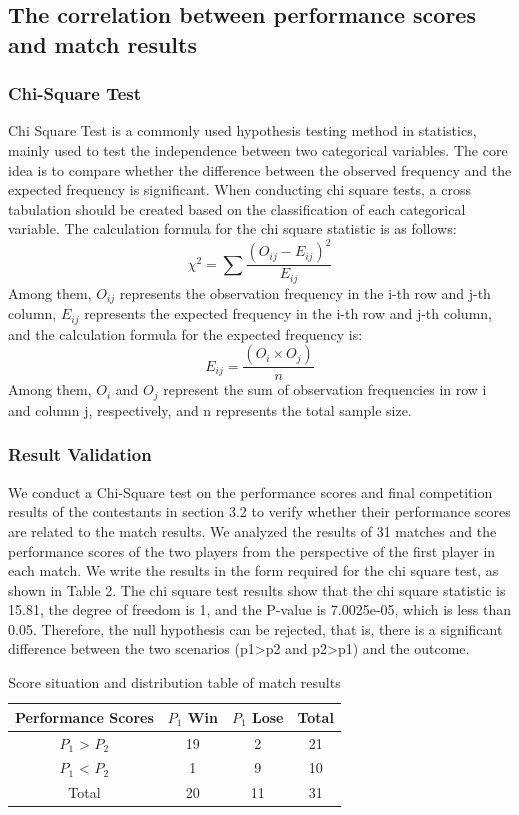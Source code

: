 \documentclass{mcmthesis}
\begin{document}
\subsection{The correlation between performance scores and match results}
\subsubsection{Chi-Square Test}
Chi Square Test is a commonly used hypothesis testing method in statistics, mainly used to test the independence between two categorical variables. The core idea is to compare whether the difference between the observed frequency and the expected frequency is significant. When conducting chi square tests, a cross tabulation should be created based on the classification of each categorical variable. The calculation formula for the chi square statistic is as follows:
\[
	\chi^{2}=\sum \frac{\left(O_{i j}-E_{i j}\right)^{2}}{E_{i j}}
\]
Among them, $O_{i j}$ represents the observation frequency in the i-th row and j-th column, $E_{i j}$ represents the expected frequency in the i-th row and j-th column, and the calculation formula for the expected frequency is:
\[
	E_{i j}=\frac{\left(O_{i} \times O_{j}\right)}{n}
\]
Among them, $O_i$ and $O_j$ represent the sum of observation frequencies in row i and column j, respectively, and n represents the total sample size.

\subsubsection{Result Validation}
We conduct a Chi-Square test on the performance scores and final competition results of the contestants in section 3.2 to verify whether their performance scores are related to the match results. We analyzed the results of 31 matches and the performance scores of the two players from the perspective of the first player in each match. We write the results in the form required for the chi square test, as shown in Table 2. The chi square test results show that the chi square statistic is 15.81, the degree of freedom is 1, and the P-value is 7.0025e-05, which is less than 0.05. Therefore, the null hypothesis can be rejected, that is, there is a significant difference between the two scenarios (p1>p2 and p2>p1) and the outcome.
\begin{table}[]
	\centering
	\begin{tabular}{cccc}
		\hline
		\textbf{Performance Scores} & \textbf{$P_1$ Win} & \textbf{$P_1$ Lose} & \textbf{Total} \\ \hline
		$P_1$ > $P_2$      & 19        & 2          & 21    \\ \hline
		$P_1$ < $P_2$      & 1         & 9          & 10    \\ \hline
		Total              & 20        & 11         & 31    \\ \hline
	\end{tabular}
	\caption{Score situation and distribution table of match results}
	\label{tab:my-table}
\end{table}
\end{document}
